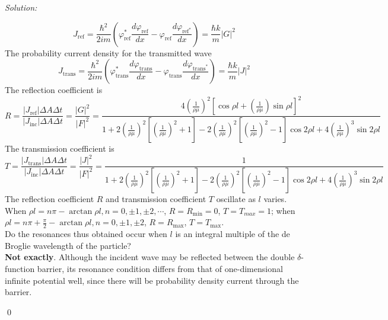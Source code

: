 \documentclass[12pt,a4paper]{article}
\newenvironment{sol}
    {\emph{Solution:}
    }
    {
    \qed
    }
\begin{document}
\begin{sol}
\begin{itemize}
\begin{equation}
J_{\text{ref}}=\frac{\hbar^2}{2im}(\varphi_{\text{ref}}^*\frac{d\varphi_{\text{ref}}}{dx}-\varphi_{\text{ref}}\frac{d\varphi_{\text{ref}^*}}{dx})=\frac{\hbar k}{m}|G|^2
\end{equation}
The probability current density for the transmitted wave
\begin{equation}
J_{\text{trans}}=\frac{\hbar^2}{2im}(\varphi_{\text{trans}}^*\frac{d\varphi_{\text{trans}}}{dx}-\varphi_{\text{trans}}\frac{d\varphi_{\text{trans}^*}}{dx})=\frac{\hbar k}{m}|J|^2
\end{equation}
The reflection coefficient is
\begin{equation}
R=\frac{|J_{\text{ref}}|\Delta A\Delta t}{|J_{\text{inc}}|\Delta A\Delta t}=\frac{|G|^2}{|F|^2}=\frac{4\left(\frac{1}{\rho\mu}\right)^2\left[\cos\rho l+\left(\frac{1}{\rho\mu}\right)\sin \rho l\right]^2}{1+2\left(\frac{1}{\rho\mu}\right)^2\left[\left(\frac{1}{\rho\mu}\right)^2+1\right]-2\left(\frac{1}{\rho\mu}\right)^2\left[\left(\frac{1}{\rho\mu}\right)^2-1\right]\cos2\rho l+4\left(\frac{1}{\rho\mu}\right)^3\sin 2\rho l}
\end{equation}
The transmission coefficient is
\begin{equation}
T=\frac{|J_{\text{trans}}|\Delta A\Delta t}{|J_{\text{inc}}|\Delta A\Delta t}=\frac{|J|^2}{|F|^2}=\frac{1}{1+2\left(\frac{1}{\rho\mu}\right)^2\left[\left(\frac{1}{\rho\mu}\right)^2+1\right]-2\left(\frac{1}{\rho\mu}\right)^2\left[\left(\frac{1}{\rho\mu}\right)^2-1\right]\cos2\rho l+4\left(\frac{1}{\rho\mu}\right)^3\sin 2\rho l}
\end{equation}
The reflection coefficient $R$ and transmission coefficient $T$ oscillate as $l$ varies. When $\rho l=n\pi-\arctan\rho l, n=0,\pm1,\pm2,\cdots$, $R=R_{\min}=0$, $T=T_{max}=1$; when $\rho l=n\pi+\frac{\pi}{2}-\arctan\rho l, n=0,\pm1,\pm2$, $R=R_{\max}$, $T=T_{\max}$.\\ 
Do the resonances thus obtained occur when $l$ is an integral multiple of the de Broglie wavelength of the particle?\\
\textbf{Not exactly}. Although the incident wave may be reflected between the double $\delta$-function barrier, its resonance condition differs from that of one-dimensional infinite potential well, since there will be probability density current through the barrier.
\end{itemize}
\end{sol}
\end{document}
